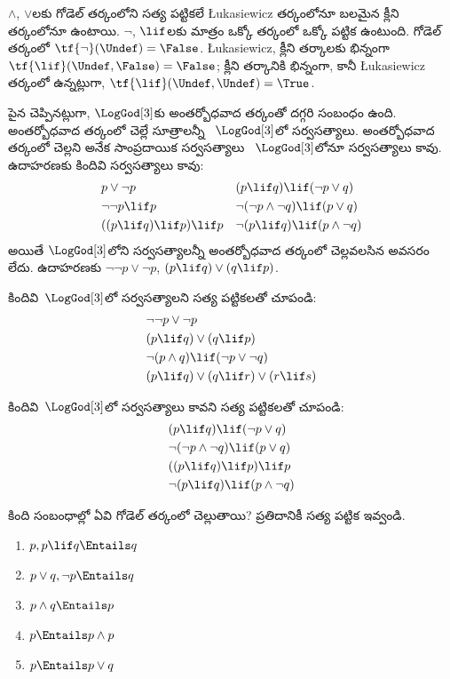 \documentclass[../../../include/open-logic-section]{subfiles}
\begin{document}
$\land$, $\lor$లకు గోడెల్ తర్కంలోని సత్య పట్టికలే
\L ukasiewicz తర్కంలోనూ బలమైన క్లీని తర్కంలోనూ ఉంటాయి.
$\lnot$, $\lif$లకు మాత్రం ఒక్కో తర్కంలో ఒక్కో పట్టిక ఉంటుంది.
గోడెల్ తర్కంలో
$\tf{\lnot}(\Undef) = \False$.
\L ukasiewicz, క్లీని తర్కాలకు భిన్నంగా
$\tf{\lif}(\Undef, \False) = \False$;
క్లీని తర్కానికి భిన్నంగా, కానీ
\L ukasiewicz తర్కంలో ఉన్నట్లుగా,
$\tf{\lif}(\Undef,
\Undef) = \True$.

పైన చెప్పినట్లుగా, $\LogGod[3]$కు అంతర్బోధవాద తర్కంతో
దగ్గరి సంబంధం ఉంది.
అంతర్బోధవాద తర్కంలో చెల్లే సూత్రాలన్నీ
~$\LogGod[3]$లో సర్వసత్యాలు. అంతర్బోధవాద
తర్కంలో చెల్లని అనేక సాంప్రదాయిక సర్వసత్యాలు
~$\LogGod[3]$లోనూ సర్వసత్యాలు కావు.
ఉదాహరణకు కిందివి సర్వసత్యాలు కావు:
\begin{align*}
  & p \lor \lnot p && (p \lif q) \lif (\lnot p \lor q) \\
  & \lnot\lnot p \lif p && \lnot(\lnot p \land \lnot q) \lif (p \lor q) \\
  & ((p \lif q) \lif p) \lif p && \lnot(p \lif q) \lif (p \land \lnot q)
\end{align*}
అయితే $\LogGod[3]$లోని సర్వసత్యాలన్నీ
అంతర్బోధవాద తర్కంలో చెల్లవలసిన అవసరం లేదు. ఉదాహరణకు
$\lnot\lnot p \lor \lnot p$, $(p
\lif q) \lor (q \lif p)$.

\begin{prob}
  కిందివి~$\LogGod[3]$లో సర్వసత్యాలని
  సత్య పట్టికలతో చూపండి:
  \begin{align*}
    & \lnot\lnot p \lor \lnot p\\
    & (p \lif q) \lor (q \lif p) \\
    & \lnot(p \land q) \lif (\lnot p \lor \lnot q) \\
    & (p \lif q) \lor (q \lif r) \lor (r \lif s)
  \end{align*}
\end{prob}

\begin{prob}
  కిందివి~$\LogGod[3]$లో సర్వసత్యాలు కావని
  సత్య పట్టికలతో చూపండి:
  \begin{align*}
    & (p \lif q) \lif (\lnot p \lor q) \\
    & \lnot(\lnot p \land \lnot q) \lif (p \lor q) \\
    & ((p \lif q) \lif p) \lif p \\
    & \lnot(p \lif q) \lif (p \land \lnot q)
  \end{align*}
\end{prob}

\begin{prob}
  కింది సంబంధాల్లో ఏవి గోడెల్ తర్కంలో
  చెల్లుతాయి? ప్రతిదానికీ సత్య పట్టిక ఇవ్వండి.
  \begin{enumerate}
    \item $p, p \lif q \Entails q$
    \item $p \lor q, \lnot p \Entails q$
    \item $p \land q \Entails p$
    \item $p \Entails p \land p$
    \item $p \Entails p \lor q$
  \end{enumerate}
\end{prob}
\end{document}
